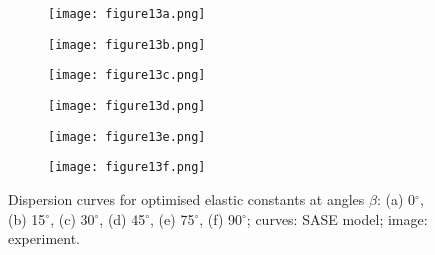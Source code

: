 \begin{figure} [h!]
	\centering
	\begin{subfigure}[b]{0.47\textwidth}
		\centering
	\texttt{[image: figure13a.png]}
		\caption{}
		\label{fig:dispersion0deg_direct}
	\end{subfigure}
\hfill
	\begin{subfigure}[b]{0.47\textwidth}
		\centering
		\texttt{[image: figure13b.png]}
		\caption{}
		\label{fig:dispersion15deg_direct}
	\end{subfigure}
\hfill
	\begin{subfigure}[b]{0.47\textwidth}
		\centering
		\texttt{[image: figure13c.png]}
		\caption{}
		\label{fig:dispersion30deg_direct}
	\end{subfigure}
\hfill
	\begin{subfigure}[b]{0.47\textwidth}
		\centering
		\texttt{[image: figure13d.png]}
		\caption{}
		\label{fig:dispersion45deg_direct}
	\end{subfigure}
\hfill
	\begin{subfigure}[b]{0.47\textwidth}
		\centering
		\texttt{[image: figure13e.png]}
		\caption{}
		\label{fig:dispersion75deg_direct}
	\end{subfigure}
\hfill
	\begin{subfigure}[b]{0.47\textwidth}
		\centering
		\texttt{[image: figure13f.png]}
		\caption{}
		\label{fig:dispersion90deg_direct}
	\end{subfigure}
	
\caption{Dispersion curves for optimised elastic constants  at angles \(\beta\): (a) 0\(^{\circ}\), (b) 15\(^{\circ}\), (c) 30\(^{\circ}\), (d) 
	45\(^{\circ}\), 
	(e) 75\(^{\circ}\), (f) 90\(^{\circ}\);   curves: SASE model; image: experiment. }

	\label{fig:optimized_direct}
\end{figure}

